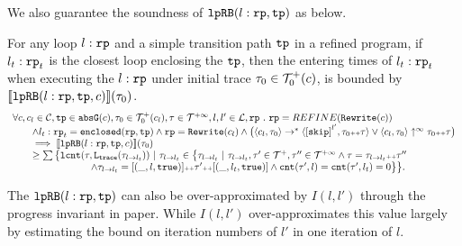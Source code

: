 We also guarantee the soundness of $\mathtt{lpRB}(l: \mathtt{rp}, \mathtt{tp})$ as below.
\begin{lem}
  \label{lem:looprb-sound}
  For any loop $l: \mathtt{rp}$ and a simple transition path $\mathtt{tp}$ in a refined program, if $l_t: \mathtt{rp}_t$ is the closest loop enclosing the $\mathtt{tp}$, then the entering times of $l_t: \mathtt{rp}_t$ when executing the $l: \mathtt{rp}$ under initial trace $\mathtt{\tau}_0 \in \mathcal{T}^{+}_0(c)$, is bounded by $\llbracket \mathtt{lpRB}(l: \mathtt{rp}, \mathtt{tp}, c) \rrbracket(\mathtt{\tau}_0)$.
  {\small
  \[
    \begin{array}{l}
    \forall c, c_l \in \cdom, \tpath \in \absG(c), \trace_0 \in \ftdom_0(c_l), \trace \in \tdom, l, l' \in \ldom, \rprog \st 
    \rprog = REFINE(\algrewrite(c))
    \\ \qquad
    \land l_t: \rprog_t = \kw{enclosed}(\rprog, \tpath)
    \land 
    \rprog = \algrewrite(c_l)
    \land
    \big(
    \config{c_l, \trace_0} \to^* \config{\clabel{\eskip}^{l'}, \trace_0 \tracecat \trace}
    \lor \config{c_l, \trace_0} \uparrow^{\infty} \trace_0 \tracecat \trace 
    \big)
    \\ \qquad
    \implies
    \econfig{\lpchB(l: \rprog, \tpath, c)}(\trace_0) 
    \\ \qquad \geq 
      \sum\big\{
      \lcounter(\trace, \tracel(\trace_{l \to l_t})) ~\vert~ \trace_{l \to l_t} \in 
      \big\{\trace_{l \to l_t} ~\vert~ 
      \trace_{l \to l_t}, \trace' \in \ftdom, \trace'' \in \tdom
      \land \trace = \trace_{l \to l_t} \tracecat \trace''
      \\ \qquad \qquad \qquad \qquad
      \land \trace_{l \to l_t} = [(\_, l, \etrue)] \tracecat \trace' \tracecat [(\_, l_t, \etrue)]
      \land \counter(\trace', l) = \counter(\trace', l_t) = 0 
      \big\}
      \big\}.
\end{array}
  \]
  }
\end{lem}
%

The $\mathtt{lpRB}(l:\mathtt{rp}, \mathtt{tp})$ 
can also be over-approximated by
$I(l, l')$ through the progress invariant in paper\cite{GulwaniJK09}.
While $I(l, l')$ over-approximates this value largely
by estimating the bound on iteration numbers of $l'$ in one iteration of $l$.

